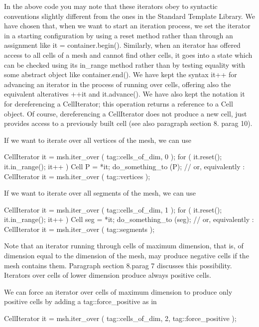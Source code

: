 {In the above code you may note that these iterators obey to syntactic conventions
slightly different from the ones in the Standard Template Library.
We have chosen that, when we want to start an iteration process, we set the iterator in
a starting configuration by using a {\codett reset} method rather than through an assignment
like {\codett it = container.begin()}.
Similarly, when an iterator has offered access to all cells of a mesh and cannot find
other cells, it goes into a state which can be checked using its {\codett in\_range} method
rather than by testing equality with some abstract object like {\codett container.end()}.
We have kept the syntax {\codett it++} for advancing an iterator in the process of
running over cells, offering also the equivalent alteratives {\codett ++it} and
{\codett it.advance()}.
We have also kept the notation {\codett *it} for dereferencing a {\codett CellIterator};
this operation returns a reference to a {\codett Cell} object.
Of course, dereferencing a {\codett CellIterator} does not produce a new cell,
just provides access to a previously built cell (see also paragraph \numb section 8.\numb
parag 10).

If we want to iterate over all vertices of the mesh, we can use

\verbatim
   CellIterator it = msh.iter_over ( tag::cells_of_dim, 0 );
   for ( it.reset(); it.in_range(); it++ )
   {  Cell P = *it;  do_something_to (P);  }
   // or, equivalently :
   CellIterator it = msh.iter_over ( tag::vertices );
\endverbatim

If we want to iterate over all segments of the mesh, we can use

\verbatim
   CellIterator it = msh.iter_over ( tag::cells_of_dim, 1 );
   for ( it.reset(); it.in_range(); it++ )
   {  Cell seg = *it;  do_something_to (seg);  }
   // or, equivalently :
   CellIterator it = msh.iter_over ( tag::segments );
\endverbatim

Note that an iterator running through cells of maximum dimension, that is, of dimension equal
to the dimension of the mesh, may produce negative cells if the mesh contains them.
Paragraph \numb section 8.\numb parag 7 discusses this possibility.
Iterators over cells of lower dimension produce always positive cells.

We can force an iterator over cells of maximum dimension to produce only positive cells
by adding a {\codett tag::force\_positive} as in

\verbatim
   CellIterator it = msh.iter_over ( tag::cells_of_dim, 2, tag::force_positive );
\endverbatim

}
